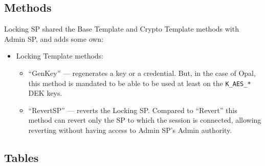 


\subsection{Methods}

Locking SP shared the Base Template and Crypto Template methods with Admin SP, and adds some own:


\begin{itemize}
\item Locking Template methods:
\begin{itemize}
\item ``GenKey'' --- regenerates a key or a credential. But, in the case of Opal, this method is mandated to be able to be used at least on the \verb|K_AES_*| DEK keys.
\item ``RevertSP'' --- reverts the Locking SP. Compared to ``Revert'' this method can revert only the SP to which the session is connected, allowing reverting without having access to Admin SP's Admin authority.
\end{itemize}
\end{itemize}

\subsection{Tables}

